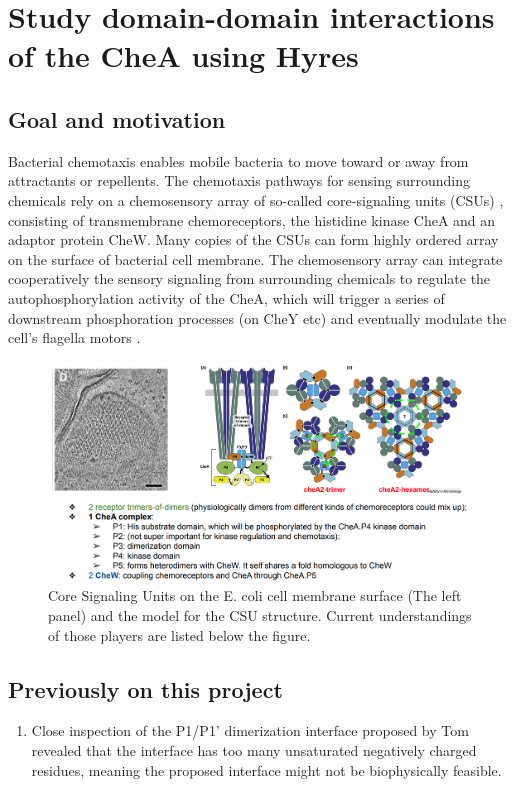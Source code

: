 \section{\textbf{Study domain-domain interactions of the CheA using Hyres}}
\subsection{Goal and motivation}
Bacterial chemotaxis enables mobile bacteria to move toward or away from attractants or repellents. The chemotaxis pathways for sensing surrounding chemicals rely on a chemosensory array of so-called core-signaling units (CSUs) \cite{muokEngineeredChemotaxisCore2020}, consisting of transmembrane chemoreceptors, the histidine kinase CheA and an adaptor protein CheW. Many copies of the CSUs can form highly ordered array on the surface of bacterial cell membrane. The chemosensory array can integrate cooperatively the sensory signaling from surrounding chemicals to regulate the autophosphorylation activity of the CheA, which will trigger a series of downstream phosphoration processes (on CheY etc) and eventually modulate the cell's flagella motors \cite{briegelMobilityTwoKinase2013}.

\begin{figure}[H]
    \centering
    \includegraphics[width=400pt]{CSU.png}
    \caption{Core Signaling Units on the E. coli cell membrane surface (The left panel) and the model for the CSU structure. Current understandings of those players are listed below the figure.}
    \label{fig:CSU}
\end{figure}


\subsection{Previously on this project}
\begin{enumerate}
    \item Close inspection of the P1/P1' dimerization interface proposed by Tom revealed that the interface has too many unsaturated negatively charged residues, meaning the proposed interface might not be biophysically feasible.
\end{enumerate}

